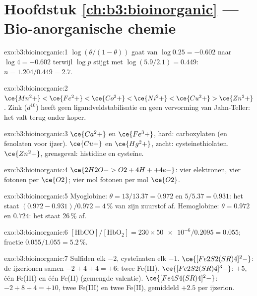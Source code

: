\section*{Hoofdstuk \ref{ch:b3:bioinorganic} --- Bio-anorganische chemie}

\begin{solution}{exo:b3:bioinorganic:1}
$\log(\theta/(1 - \theta))$ gaat van $\log 0.25 = -0.602$ naar $\log 4 = +0.602$ terwijl $\log p$ stijgt met
$\log(5.9/2.1) = 0.449$: $n = 1.204/0.449 = 2.7$.
\end{solution}

\begin{solution}{exo:b3:bioinorganic:2}
$\ce{Mn^2+} < \ce{Fe^2+} < \ce{Co^2+} < \ce{Ni^2+} < \ce{Cu^2+} > \ce{Zn^2+}$. Zink ($d^{10}$) heeft geen ligandveldstabilisatie en geen
vervorming van Jahn-Teller: het valt terug onder koper.
\end{solution}

\begin{solution}{exo:b3:bioinorganic:3}
$\ce{Ca^2+}$ en $\ce{Fe^3+}$, hard: carboxylaten (en fenolaten voor ijzer). $\ce{Cu+}$ en $\ce{Hg^2+}$, zacht:
cysteïnethiolaten. $\ce{Zn^2+}$, grensgeval: histidine en cysteïne.
\end{solution}

\begin{solution}{exo:b3:bioinorganic:4}
$\ce{2H2O -> O2 + 4H+ + 4e-}$: vier elektronen, vier fotonen per $\ce{O2}$; vier mol fotonen per
mol $\ce{O2}$.
\end{solution}

\begin{solution}{exo:b3:bioinorganic:5}
Myoglobine: $\theta = 13/13.37 = 0.972$ en $5/5.37 = 0.931$: het staat $(0.972 - 0.931)/0.972 = 4$\,\% van zijn
zuurstof af. Hemoglobine: $\theta = 0.972$ en $0.724$: het staat 26\,\% af.
\end{solution}

\begin{solution}{exo:b3:bioinorganic:6}
$[\mathrm{HbCO}]/[\mathrm{HbO_2}] = 230 \times \num{50e-6}/0.2095 = 0.055$; fractie $0.055/1.055 = 5.2$\,\%.
\end{solution}

\begin{solution}{exo:b3:bioinorganic:7}
Sulfiden elk $-2$, cysteïnaten elk $-1$. $\ce{[Fe2S2(SR)4]^2-}$: de ijzerionen samen $-2 + 4 + 4 = +6$: twee
Fe(III). $\ce{[Fe2S2(SR)4]^3-}$: $+5$, één Fe(III) en één Fe(II) (gemengde valentie). $\ce{[Fe4S4(SR)4]^2-}$:
$-2 + 8 + 4 = +10$, twee Fe(III) en twee Fe(II), gemiddeld $+2.5$ per ijzerion.
\end{solution}

